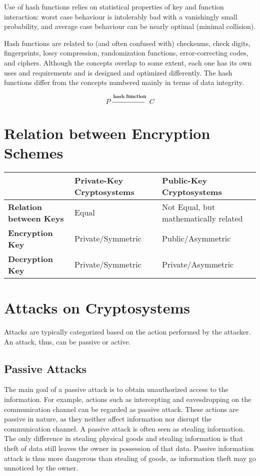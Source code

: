 \documentclass[british]{report}
\providecommand{\tabularnewline}{\\}
\begin{document}
Use of hash functions relies on statistical properties of key and
function interaction: worst case behaviour is intolerably bad with
a vanishingly small probability, and average case behaviour can be
nearly optimal (minimal collision).

Hash functions are related to (and often confused with) checksums,
check digits, fingerprints, lossy compression, randomization functions,
error-correcting codes, and ciphers. Although the concepts overlap
to some extent, each one has its own uses and requirements and is
designed and optimized differently. The hash functions differ from
the concepts numbered mainly in terms of data integrity.

\[
	P\xrightarrow{\:\textbf{hash function}\:}C
\]


\section{Relation between Encryption Schemes}
\begin{center}
	\begin{tabular}{|l||l|l|}
		\hline
		                               & \textbf{Private-Key Cryptosystems} & \textbf{Public-Key Cryptosystems}\tabularnewline
		\hline
		\hline
		\textbf{Relation between Keys} & Equal                              & Not Equal, but mathematically related\tabularnewline
		\hline
		\textbf{Encryption Key}        & Private/Symmetric                  & Public/Asymmetric\tabularnewline
		\hline
		\textbf{Decryption Key}        & Private/Symmetric                  & Private/Asymmetric\tabularnewline
		\hline
	\end{tabular}
	\par\end{center}

\vfill{}


\section{Attacks on Cryptosystems}

Attacks are typically categorized based on the action performed by
the attacker. An attack, thus, can be passive or active.

\subsection{Passive Attacks}

The main goal of a passive attack is to obtain unauthorized access
to the information. For example, actions such as intercepting and
eavesdropping on the communication channel can be regarded as passive
attack. These actions are passive in nature, as they neither affect
information nor disrupt the communication channel. A passive attack
is often seen as stealing information. The only difference in stealing
physical goods and stealing information is that theft of data still
leaves the owner in possession of that data. Passive information attack
is thus more dangerous than stealing of goods, as information theft
may go unnoticed by the owner.
\end{document}
